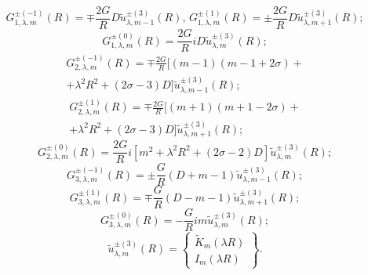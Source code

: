 \begin{russian}
\begin{equation}
G_{1,\lambda ,m}^{ \pm ( - 1)}(R) =  \mp \frac{{2G}}{R}D\tilde u_{\lambda ,m - 1}^{ \pm (3)}(R),\, G_{1,\lambda ,m}^{ \pm (1)}(R) =  \pm \frac{{2G}}{R}D\tilde u_{\lambda ,m + 1}^{ \pm (3)}(R);
\label{eq:7:35}
\end{equation}
\begin{equation}
G_{1,\lambda ,m}^{ \pm (0)}(R) = \frac{{2G}}{R}iD\tilde u_{\lambda ,m}^{ \pm (3)}(R);
\label{eq:7:36}
\end{equation}
\begin{multline}
G_{2,\lambda ,m}^{ \pm ( - 1)}(R) = \mp \frac{{2G}}{R}\bigg[(m - 1)(m - 1 + 2\sigma ) + \\
+ {\lambda ^2}{R^2} + (2\sigma  - 3)D\bigg]\tilde u_{\lambda ,m - 1}^{ \pm (3)}(R);
\label{eq:7:37}
\end{multline}
\begin{multline}
G_{2,\lambda ,m}^{ \pm (1)}(R) = \mp \frac{{2G}}{R}\bigg[ (m + 1)(m + 1 - 2\sigma ) + \\
+ {\lambda ^2}{R^2} + (2\sigma  - 3)D \bigg]\tilde u_{\lambda ,m + 1}^{ \pm (3)}(R);
\label{eq:7:38}
\end{multline}
\begin{equation}
G_{2,\lambda ,m}^{ \pm (0)}(R) = \frac{{2G}}{R}i\left[ {{m^2} + {\lambda ^2}{R^2} + (2\sigma  - 2)D} \right]\tilde u_{\lambda ,m}^{ \pm (3)}(R);
\label{eq:7:39}
\end{equation}
\begin{equation}
G_{3,\lambda ,m}^{ \pm ( - 1)}(R) =  \pm \frac{G}{R}\left( {D + m - 1} \right)\tilde u_{\lambda ,m - 1}^{ \pm (3)}(R);
\label{eq:7:40}
\end{equation}
\begin{equation}
G_{3,\lambda ,m}^{ \pm (1)}(R) =  \mp \frac{G}{R}\left( {D - m - 1} \right)\tilde u_{\lambda ,m + 1}^{ \pm (3)}(R);
\label{eq:7:41}
\end{equation}
\begin{equation}
G_{3,\lambda ,m}^{ \pm (0)}(R) =  - \frac{G}{R}im\tilde u_{\lambda ,m}^{ \pm (3)}(R);
\label{eq:7:41a}
\end{equation}
\begin{equation}
\tilde u_{\lambda ,m}^{ \pm (3)}(R) = \left\{ \begin{array}{l}
{{\tilde K}_m}\left( {\lambda R} \right)\\
{I_m}\left( {\lambda R} \right)
\end{array} \right\}.
\label{eq:7:42}
\end{equation}


\end{russian}
